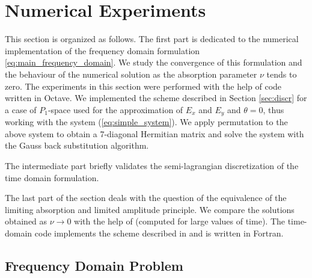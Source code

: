 
\section{Numerical Experiments}
This section is organized as follows. The first part is dedicated to the numerical implementation
of the frequency domain formulation \eqref{eq:main_frequency_domain}. We study the convergence of this formulation and the behaviour 
of the numerical solution as the absorption parameter $\nu$ tends to zero. The experiments in this section were 
performed with the help of  code written in Octave.  
We implemented the scheme described in Section \ref{sec:discr} for a case of $P_{1}$-space used 
for the approximation of $E_{x}$ and $E_{y}$ and $\theta=0$, thus working with the system (\ref{eq:simple_system}). 
We apply permutation to the above system 
to obtain a 7-diagonal Hermitian matrix and solve the system with the Gauss back substitution algorithm. 

The intermediate part briefly validates the semi-lagrangian discretization of the time domain formulation.

The last part of the section deals with the question of the equivalence of the limiting absorption and limited amplitude 
principle. We compare the solutions obtained as $\nu\rightarrow 0$ with the help of (computed for large values of time). 
The time-domain code implements the scheme described in  and 
is written in Fortran.
 
\subsection{Frequency Domain Problem}
\label{sec:freq_dep}
